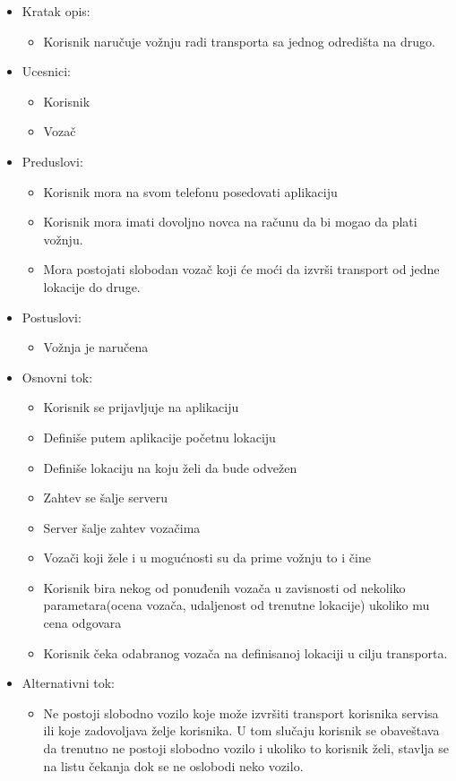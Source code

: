 \begin{itemize}
	\item Kratak opis:
		\begin{itemize}
			\item Korisnik naručuje vožnju radi transporta sa jednog odredišta na drugo.
		\end{itemize}
 
	\item Ucesnici:
		\begin{itemize}
			\item Korisnik
		    \item Vozač
		\end{itemize}				

	\item Preduslovi:
		\begin{itemize}
		    \item Korisnik mora na svom telefonu posedovati aplikaciju
		    \item Korisnik mora imati dovoljno novca na računu da bi mogao da plati vožnju.
		    \item Mora postojati slobodan vozač koji će moći da izvrši transport od jedne lokacije do druge.
		\end{itemize}

	\item Postuslovi:
		\begin{itemize}
			\item Vožnja je naručena
		\end{itemize}		


	\item Osnovni tok:
		\begin{itemize}
		    \item Korisnik se prijavljuje na aplikaciju
		    \item Definiše putem  aplikacije  početnu lokaciju
		    \item Definiše lokaciju na koju želi da bude odvežen
		    \item Zahtev se šalje serveru
		    \item Server šalje zahtev vozačima
		    \item Vozači koji žele i u mogućnosti su da prime vožnju to i čine
		    \item Korisnik bira  nekog od ponuđenih vozača u zavisnosti od nekoliko parametara(ocena vozača, udaljenost od trenutne lokacije) ukoliko mu cena odgovara
		    \item Korisnik čeka odabranog vozača na definisanoj lokaciji u cilju transporta. 
		\end{itemize}

	\item Alternativni tok:
		\begin{itemize}
    		\item Ne postoji slobodno vozilo koje može izvršiti transport korisnika servisa ili koje zadovoljava želje korisnika. U tom slučaju 
		    korisnik se obaveštava da trenutno ne postoji slobodno  vozilo i ukoliko to korisnik želi, stavlja se na listu čekanja dok se ne oslobodi neko vozilo.
		\end{itemize}
\end{itemize}

